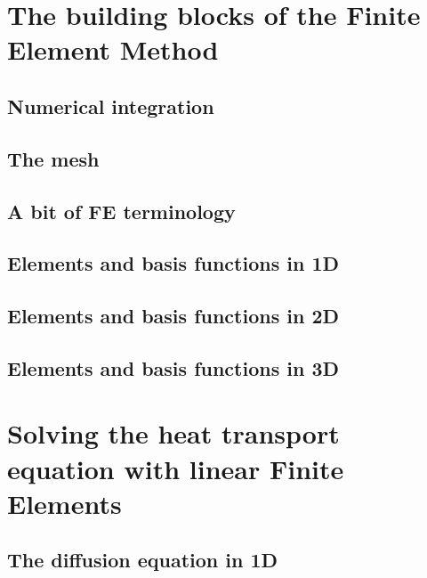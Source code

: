 \documentclass[a4paper]{article}
\begin{document}
\newpage
\section{The building blocks of the Finite Element Method} %
\subsection{Numerical integration}  %
\subsection{The mesh}
\subsection{A bit of FE terminology}  %
\subsection{Elements and basis functions in 1D}  %
\subsection{Elements and basis functions in 2D}\label{sec:shpfct2d}  %
\subsection{Elements and basis functions in 3D}  %


\newpage 
\section{Solving the heat transport equation with linear Finite Elements} %
\subsection{The diffusion equation in 1D} \label{sec:diff1D}  %
\end{document}
